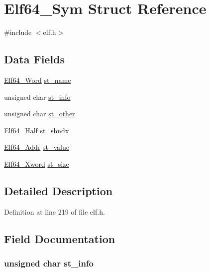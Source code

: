 \hypertarget{struct_elf64___sym}{\section{Elf64\-\_\-\-Sym Struct Reference}
\label{struct_elf64___sym}
}


{\ttfamily \#include $<$elf.\-h$>$}

\subsection*{Data Fields}
\begin{DoxyCompactItemize}
\item 
\hyperlink{elf_8h_aa3aa1920ed115b7ef7e99716fece4401}{Elf64\-\_\-\-Word} \hyperlink{struct_elf64___sym_a8f2705c79bc5128540f411c13d6f0412}{st\-\_\-name}
\item 
unsigned char \hyperlink{struct_elf64___sym_aea2537362e780656ee6de9fe80584a28}{st\-\_\-info}
\item 
unsigned char \hyperlink{struct_elf64___sym_a3985eac957789a1918f606a473461b58}{st\-\_\-other}
\item 
\hyperlink{elf_8h_adb6a5584018b431da3472e7c6a7fd731}{Elf64\-\_\-\-Half} \hyperlink{struct_elf64___sym_ac32e42dcbd7f5e6a9db400e3320940a2}{st\-\_\-shndx}
\item 
\hyperlink{elf_8h_aeed51d08e3a950d637f8ec1f0cd4ef65}{Elf64\-\_\-\-Addr} \hyperlink{struct_elf64___sym_a2d1c1b24798a630f2fa8a2641b7f3292}{st\-\_\-value}
\item 
\hyperlink{elf_8h_a5447a48a3dae0bd24f606415268c6fe4}{Elf64\-\_\-\-Xword} \hyperlink{struct_elf64___sym_a31272eb525eeba736089d6a6429622bc}{st\-\_\-size}
\end{DoxyCompactItemize}


\subsection{Detailed Description}


Definition at line 219 of file elf.\-h.



\subsection{Field Documentation}
\hypertarget{struct_elf64___sym_aea2537362e780656ee6de9fe80584a28}{
\subsubsection[{st\-\_\-info}]{\setlength{\rightskip}{0pt plus 5cm}unsigned char st\-\_\-info}}\label{struct_elf64___sym_aea2537362e780656ee6de9fe80584a28}


